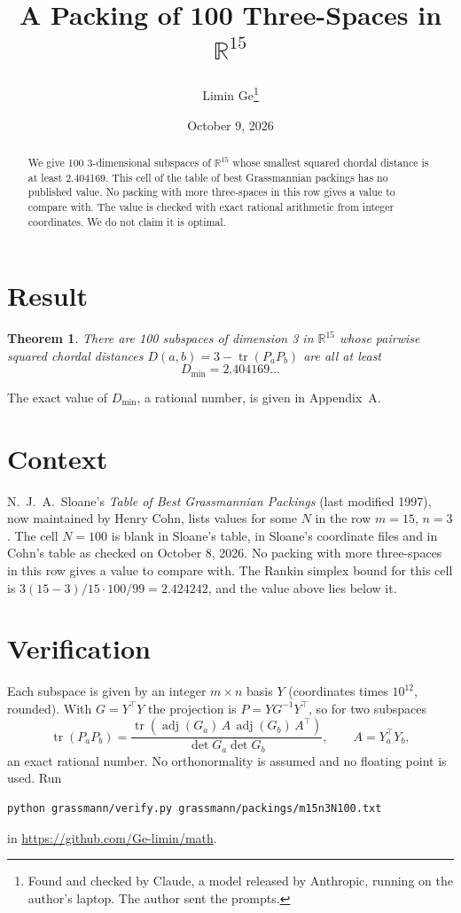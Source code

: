 \documentclass[11pt,a4paper]{article}
\title{A Packing of 100 Three-Spaces in $\mathbb{R}^{15}$}
\author{Limin Ge\thanks{Found and checked by Claude, a model released by Anthropic, running on the author's laptop. The author sent the prompts.}}
\date{October 9, 2026}
\newtheorem*{theorem}{Theorem}
\begin{document}
\maketitle
\begin{abstract}
We give 100 3-dimensional subspaces of $\mathbb{R}^{15}$ whose smallest squared chordal distance is at least 2.404169. This cell of the table of best Grassmannian packings has no published value. No packing with more three-spaces in this row gives a value to compare with. The value is checked with exact rational arithmetic from integer coordinates. We do not claim it is optimal.
\end{abstract}

\section{Result}
\begin{theorem}
There are 100 subspaces of dimension 3 in $\mathbb{R}^{15}$ whose pairwise squared chordal distances $D(a,b) = 3 - \operatorname{tr}(P_aP_b)$ are all at least
\[ D_{\min} = 2.404169\ldots \]
\end{theorem}
The exact value of $D_{\min}$, a rational number, is given in Appendix~A.


\section{Context}
N.~J.~A.~Sloane's \emph{Table of Best Grassmannian Packings} (last modified 1997), now maintained by Henry Cohn, lists values for some $N$ in the row $m=15$, $n=3$. The cell $N=100$ is blank in Sloane's table, in Sloane's coordinate files and in Cohn's table as checked on October 8, 2026. No packing with more three-spaces in this row gives a value to compare with. The Rankin simplex bound for this cell is $3(15-3)/15\cdot 100/99 = 2.424242$, and the value above lies below it.


\section{Verification}
Each subspace is given by an integer $m\times n$ basis $Y$ (coordinates times $10^{12}$, rounded). With $G=Y^\top Y$ the projection is $P=YG^{-1}Y^\top$, so for two subspaces
\[ \operatorname{tr}(P_aP_b)=\frac{\operatorname{tr}(\operatorname{adj}(G_a)\,A\,\operatorname{adj}(G_b)\,A^\top)}{\det G_a\det G_b},\qquad A=Y_a^\top Y_b, \]
an exact rational number. No orthonormality is assumed and no floating point is used. Run
\begin{verbatim}
python grassmann/verify.py grassmann/packings/m15n3N100.txt
\end{verbatim}
in \url{https://github.com/Ge-limin/math}.
\end{document}
